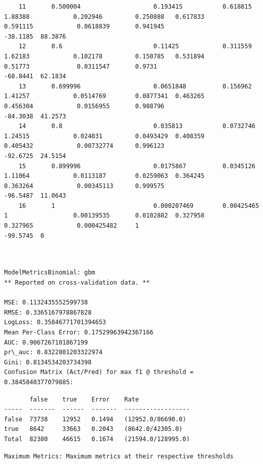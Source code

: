 \documentclass[11pt]{article}
\begin{document}
\begin{verbatim}
    11       0.500004                    0.193415           0.618815    1.88388            0.202946         0.250888   0.617833                    0.591115            0.0618839       0.941945                   -38.1185  88.3876
    12       0.6                         0.11425            0.311559    1.62183            0.102178         0.150785   0.531894                    0.51773             0.0311547       0.9731                     -68.8441  62.1834
    13       0.699996                    0.0651848          0.156962    1.41257            0.0514769        0.0877341  0.463265                    0.456304            0.0156955       0.988796                   -84.3038  41.2573
    14       0.8                         0.035813           0.0732746   1.24515            0.024031         0.0493429  0.408359                    0.405432            0.00732774      0.996123                   -92.6725  24.5154
    15       0.899996                    0.0175867          0.0345126   1.11064            0.0113187        0.0259063  0.364245                    0.363264            0.00345113      0.999575                   -96.5487  11.0643
    16       1                           0.000207469        0.00425465  1                  0.00139535       0.0102882  0.327958                    0.327965            0.000425482     1                          -99.5745  0
    \end{verbatim}

    
    \begin{Verbatim}[commandchars=\\\{\}]


ModelMetricsBinomial: gbm
** Reported on cross-validation data. **

MSE: 0.1132435552599738
RMSE: 0.3365167978867828
LogLoss: 0.35846771701394653
Mean Per-Class Error: 0.17529963942367166
AUC: 0.9067267101867199
pr\_auc: 0.8322801203322974
Gini: 0.8134534203734398
Confusion Matrix (Act/Pred) for max f1 @ threshold = 0.3845840377079885: 

    \end{Verbatim}

    
    \begin{verbatim}
       false    true    Error    Rate
-----  -------  ------  -------  ------------------
false  73738    12952   0.1494   (12952.0/86690.0)
true   8642     33663   0.2043   (8642.0/42305.0)
Total  82380    46615   0.1674   (21594.0/128995.0)
    \end{verbatim}

    
    \begin{Verbatim}[commandchars=\\\{\}]
Maximum Metrics: Maximum metrics at their respective thresholds


    \end{Verbatim}
\end{document}
